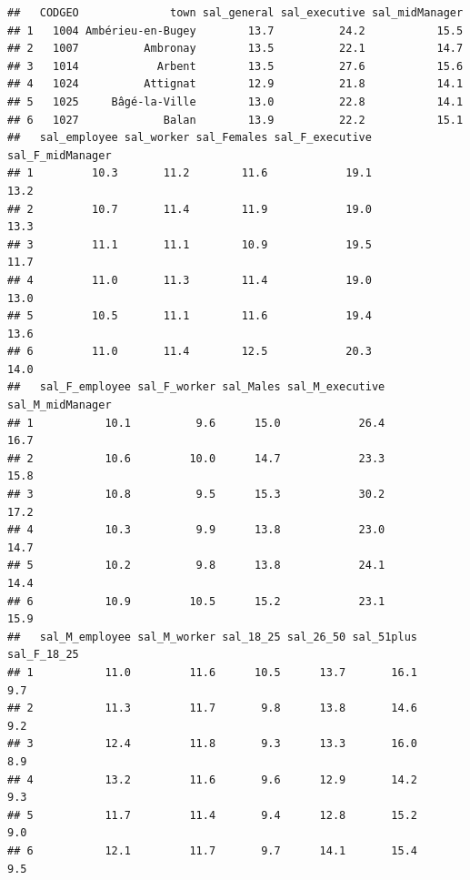 \documentclass[]{article}
\newenvironment{Shaded}{\begin{snugshade}}{\end{snugshade}}
\newcommand{\KeywordTok}[1]{\textcolor[rgb]{0.13,0.29,0.53}{\textbf{#1}}}
\newcommand{\DecValTok}[1]{\textcolor[rgb]{0.00,0.00,0.81}{#1}}
\newcommand{\StringTok}[1]{\textcolor[rgb]{0.31,0.60,0.02}{#1}}
\newcommand{\CommentTok}[1]{\textcolor[rgb]{0.56,0.35,0.01}{\textit{#1}}}
\newcommand{\OperatorTok}[1]{\textcolor[rgb]{0.81,0.36,0.00}{\textbf{#1}}}
\newcommand{\NormalTok}[1]{#1}
\begin{document}
\begin{Shaded}
\end{Shaded}

\begin{verbatim}
##   CODGEO              town sal_general sal_executive sal_midManager
## 1   1004 Ambérieu-en-Bugey        13.7          24.2           15.5
## 2   1007          Ambronay        13.5          22.1           14.7
## 3   1014            Arbent        13.5          27.6           15.6
## 4   1024          Attignat        12.9          21.8           14.1
## 5   1025     Bâgé-la-Ville        13.0          22.8           14.1
## 6   1027             Balan        13.9          22.2           15.1
##   sal_employee sal_worker sal_Females sal_F_executive sal_F_midManager
## 1         10.3       11.2        11.6            19.1             13.2
## 2         10.7       11.4        11.9            19.0             13.3
## 3         11.1       11.1        10.9            19.5             11.7
## 4         11.0       11.3        11.4            19.0             13.0
## 5         10.5       11.1        11.6            19.4             13.6
## 6         11.0       11.4        12.5            20.3             14.0
##   sal_F_employee sal_F_worker sal_Males sal_M_executive sal_M_midManager
## 1           10.1          9.6      15.0            26.4             16.7
## 2           10.6         10.0      14.7            23.3             15.8
## 3           10.8          9.5      15.3            30.2             17.2
## 4           10.3          9.9      13.8            23.0             14.7
## 5           10.2          9.8      13.8            24.1             14.4
## 6           10.9         10.5      15.2            23.1             15.9
##   sal_M_employee sal_M_worker sal_18_25 sal_26_50 sal_51plus sal_F_18_25
## 1           11.0         11.6      10.5      13.7       16.1         9.7
## 2           11.3         11.7       9.8      13.8       14.6         9.2
## 3           12.4         11.8       9.3      13.3       16.0         8.9
## 4           13.2         11.6       9.6      12.9       14.2         9.3
## 5           11.7         11.4       9.4      12.8       15.2         9.0
## 6           12.1         11.7       9.7      14.1       15.4         9.5

\end{verbatim}
\end{document}

